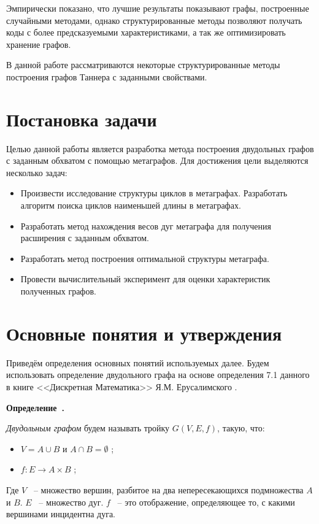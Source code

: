 \documentclass[14pt]{mmcs-article}
\newcounter{definition}[section]
\newenvironment{definition}[1][]{\refstepcounter{definition}\par\medskip
    \noindent \textbf{Определение~\thedefinition. #1} \rmfamily
}
{\medskip}
\begin{document}
Эмпирически показано, что лучшие результаты показывают графы, построенные случайными методами, однако структурированные методы позволяют получать коды с более предсказуемыми характеристиками, а так же оптимизировать хранение графов. 

В данной работе рассматриваются некоторые структурированные методы построения графов Таннера с заданными свойствами.

\newpage
{}

\section*{Постановка задачи}

Целью данной работы является разработка метода построения двудольных графов с заданным обхватом с помощью метаграфов. Для достижения цели выделяются несколько задач:

\begin{itemize}
  \item Произвести исследование структуры циклов в метаграфах. Разработать алгоритм поиска циклов наименьшей длины в метаграфах.
  \item Разработать метод нахождения весов дуг метаграфа для получения расширения с заданным обхватом.
  \item Разработать метод построения оптимальной структуры метаграфа.
  \item Провести вычислительный эксперимент для оценки характеристик полученных графов.
\end{itemize}

\newpage
\section{Основные понятия и утверждения}

Приведём определения основных понятий используемых далее. Будем использовать определение двудольного графа на основе определения 7.1 данного в книге <<Дискретная Математика>> Я.М. Ерусалимского \cite{epyc_discrete_math}.


\begin{definition}
    \textsl{Двудольным графом} будем называть тройку $ G(V, E, f)$, такую, что:

\begin{itemize}
    \item $V = A \cup B$ и $A \cap B = \emptyset$ ;
    \item $f: E \rightarrow A \times B$ ;
\end{itemize}

Где $V$ ~-- множество вершин, разбитое на два непересекающихся подмножества $A$ и $B$.
$E$ ~-- множество дуг.
$f$ ~-- это отображение, определяющее то, с какими вершинами инцидентна дуга.

\end{definition}
\end{document}

